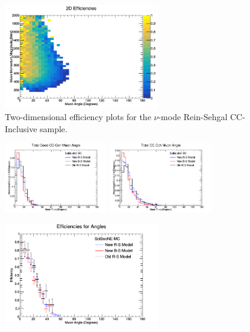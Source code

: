\documentclass[11pt]{article}
\begin{document}
\begin{figure}[H]
\centering
\includegraphics[width=0.6\textwidth]{CCInclusivePlots/2DEffCompareNMORS.png}
\caption{Two-dimensional efficiency plots for the $\nu$-mode Rein-Sehgal CC-Inclusive sample.}
\end{figure}

\begin{figure}[H]
\centering
\includegraphics[width=0.4\textwidth]{NMCombinedPlotsImages/14-NMCombinedPlots.png}
\includegraphics[width=0.4\textwidth]{NMCombinedPlotsImages/16-NMCombinedPlots.png}
\caption{}
\end{figure}

\begin{figure}[H]
\centering
\includegraphics[width=0.6\textwidth]{NMCombinedPlotsImages/24-NMCombinedPlots.png}
\caption{}
\end{figure}
\end{document}
